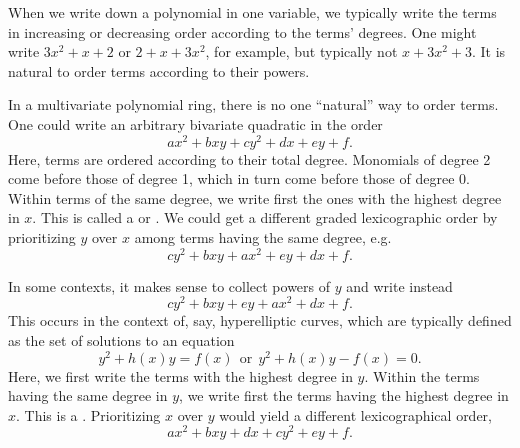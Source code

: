 When we write down a polynomial in one variable, we typically write the terms in increasing or decreasing order according to the terms' degrees.
One might write $3x^2 + x + 2$ or $2 + x + 3x^2$, for example, but typically not $x + 3x^2 + 3$.
It is natural to order terms according to their powers.

In a multivariate polynomial ring, there is no one ``natural'' way to order terms.
One could write an arbitrary bivariate quadratic in the order
  \[ ax^2 + bxy + cy^2 + dx + ey + f. \]
Here, terms are ordered according to their total degree.
Monomials of degree 2 come before those of degree 1, which in turn come before those of degree 0.
Within terms of the same degree, we write first the ones with the highest degree in $x$.
This is called a  or .
We could get a different graded lexicographic order by prioritizing $y$ over $x$ among terms having the same degree, e.g.
  \[ cy^2 + bxy + ax^2 + ey + dx + f. \]

In some contexts, it makes sense to collect powers of $y$ and write instead
  \[ cy^2 + bxy + ey + ax^2 + dx + f. \]
This occurs in the context of, say, hyperelliptic curves, which are typically defined as the set of solutions to an equation
  \[ y^2 + h(x)y = f(x) ~~\text{or}~~ y^2 + h(x)y - f(x) = 0. \]
Here, we first write the terms with the highest degree in $y$.
Within the terms having the same degree in $y$, we write first the terms having the highest degree in $x$.
This is a .
Prioritizing $x$ over $y$ would yield a different lexicographical order,
  \[ ax^2 + bxy + dx + cy^2 + ey + f. \]

